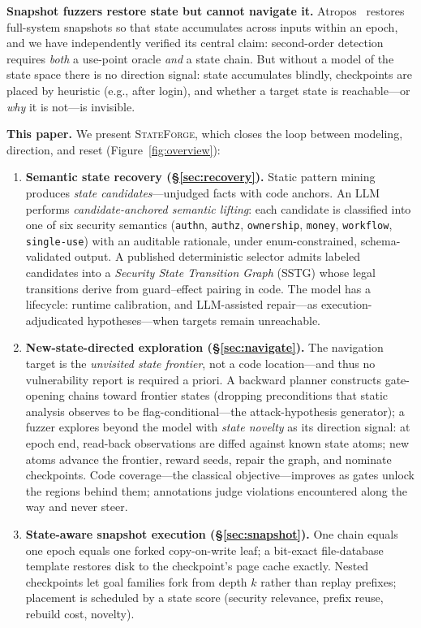 \documentclass[letterpaper,twocolumn,10pt]{article}
\newcommand{\sys}{\textsc{StateForge}}
\begin{document}
\textbf{Snapshot fuzzers restore state but cannot navigate it.} Atropos~\cite{atropos} restores full-system snapshots so that state accumulates across inputs within an epoch, and we have independently verified its central claim: second-order detection requires \emph{both} a use-point oracle \emph{and} a state chain. But without a model of the state space there is no direction signal: state accumulates blindly, checkpoints are placed by heuristic (e.g., after login), and whether a target state is reachable---or \emph{why} it is not---is invisible.

\textbf{This paper.} We present \sys{}, which closes the loop between modeling, direction, and reset (Figure~\ref{fig:overview}):

\begin{enumerate}
\item \textbf{Semantic state recovery (\S\ref{sec:recovery}).} Static pattern mining produces \emph{state candidates}---unjudged facts with code anchors. An LLM performs \emph{candidate-anchored semantic lifting}: each candidate is classified into one of six security semantics (\texttt{authn}, \texttt{authz}, \texttt{ownership}, \texttt{money}, \texttt{workflow}, \texttt{single-use}) with an auditable rationale, under enum-constrained, schema-validated output. A published deterministic selector admits labeled candidates into a \emph{Security State Transition Graph} (SSTG) whose legal transitions derive from guard--effect pairing in code. The model has a lifecycle: runtime calibration, and LLM-assisted repair---as execution-adjudicated hypotheses---when targets remain unreachable.
\item \textbf{New-state-directed exploration (\S\ref{sec:navigate}).} The navigation target is the \emph{unvisited state frontier}, not a code location---and thus no vulnerability report is required a priori. A backward planner constructs gate-opening chains toward frontier states (dropping preconditions that static analysis observes to be flag-conditional---the attack-hypothesis generator); a fuzzer explores beyond the model with \emph{state novelty} as its direction signal: at epoch end, read-back observations are diffed against known state atoms; new atoms advance the frontier, reward seeds, repair the graph, and nominate checkpoints. Code coverage---the classical objective---improves as gates unlock the regions behind them; annotations judge violations encountered along the way and never steer.
\item \textbf{State-aware snapshot execution (\S\ref{sec:snapshot}).} One chain equals one epoch equals one forked copy-on-write leaf; a bit-exact file-database template restores disk to the checkpoint's page cache exactly. Nested checkpoints let goal families fork from depth $k$ rather than replay prefixes; placement is scheduled by a state score (security relevance, prefix reuse, rebuild cost, novelty).

\end{enumerate}
\end{document}
